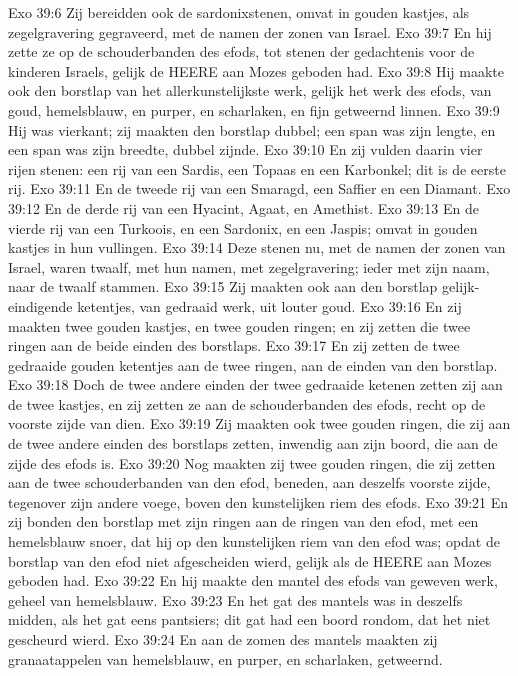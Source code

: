 Exo 39:6  Zij bereidden ook de sardonixstenen, omvat in gouden kastjes, als zegelgravering gegraveerd, met de namen der zonen van Israel.
Exo 39:7  En hij zette ze op de schouderbanden des efods, tot stenen der gedachtenis voor de kinderen Israels, gelijk de HEERE aan Mozes geboden had.
Exo 39:8  Hij maakte ook den borstlap van het allerkunstelijkste werk, gelijk het werk des efods, van goud, hemelsblauw, en purper, en scharlaken, en fijn getweernd linnen.
Exo 39:9  Hij was vierkant; zij maakten den borstlap dubbel; een span was zijn lengte, en een span was zijn breedte, dubbel zijnde.
Exo 39:10  En zij vulden daarin vier rijen stenen: een rij van een Sardis, een Topaas en een Karbonkel; dit is de eerste rij.
Exo 39:11  En de tweede rij van een Smaragd, een Saffier en een Diamant.
Exo 39:12  En de derde rij van een Hyacint, Agaat, en Amethist.
Exo 39:13  En de vierde rij van een Turkoois, en een Sardonix, en een Jaspis; omvat in gouden kastjes in hun vullingen.
Exo 39:14  Deze stenen nu, met de namen der zonen van Israel, waren twaalf, met hun namen, met zegelgravering; ieder met zijn naam, naar de twaalf stammen.
Exo 39:15  Zij maakten ook aan den borstlap gelijk-eindigende ketentjes, van gedraaid werk, uit louter goud.
Exo 39:16  En zij maakten twee gouden kastjes, en twee gouden ringen; en zij zetten die twee ringen aan de beide einden des borstlaps.
Exo 39:17  En zij zetten de twee gedraaide gouden ketentjes aan de twee ringen, aan de einden van den borstlap.
Exo 39:18  Doch de twee andere einden der twee gedraaide ketenen zetten zij aan de twee kastjes, en zij zetten ze aan de schouderbanden des efods, recht op de voorste zijde van dien.
Exo 39:19  Zij maakten ook twee gouden ringen, die zij aan de twee andere einden des borstlaps zetten, inwendig aan zijn boord, die aan de zijde des efods is.
Exo 39:20  Nog maakten zij twee gouden ringen, die zij zetten aan de twee schouderbanden van den efod, beneden, aan deszelfs voorste zijde, tegenover zijn andere voege, boven den kunstelijken riem des efods.
Exo 39:21  En zij bonden den borstlap met zijn ringen aan de ringen van den efod, met een hemelsblauw snoer, dat hij op den kunstelijken riem van den efod was; opdat de borstlap van den efod niet afgescheiden wierd, gelijk als de HEERE aan Mozes geboden had.
Exo 39:22  En hij maakte den mantel des efods van geweven werk, geheel van hemelsblauw.
Exo 39:23  En het gat des mantels was in deszelfs midden, als het gat eens pantsiers; dit gat had een boord rondom, dat het niet gescheurd wierd.
Exo 39:24  En aan de zomen des mantels maakten zij granaatappelen van hemelsblauw, en purper, en scharlaken, getweernd.
